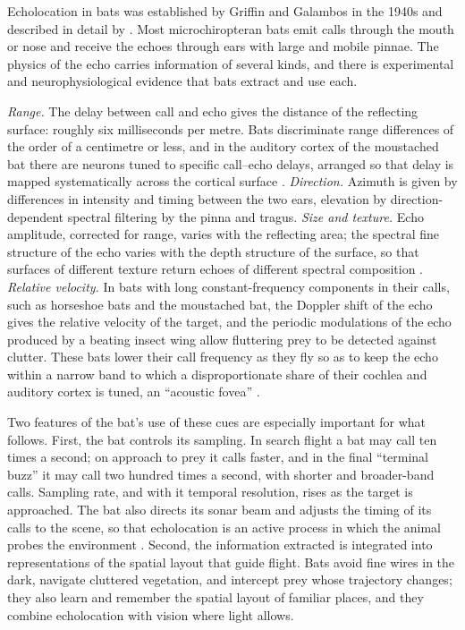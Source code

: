 \documentclass{situationist-preprint}
\begin{document}
Echolocation in bats was established by Griffin and Galambos in the 1940s and described in detail by \citet{Griffin1958}. Most microchiropteran bats emit calls through the mouth or nose and receive the echoes through ears with large and mobile pinnae. The physics of the echo carries information of several kinds, and there is experimental and neurophysiological evidence that bats extract and use each.

\emph{Range.} The delay between call and echo gives the distance of the reflecting surface: roughly six milliseconds per metre. Bats discriminate range differences of the order of a centimetre or less, and in the auditory cortex of the moustached bat there are neurons tuned to specific call--echo delays, arranged so that delay is mapped systematically across the cortical surface \citep{Suga1990}. \emph{Direction.} Azimuth is given by differences in intensity and timing between the two ears, elevation by direction-dependent spectral filtering by the pinna and tragus. \emph{Size and texture.} Echo amplitude, corrected for range, varies with the reflecting area; the spectral fine structure of the echo varies with the depth structure of the surface, so that surfaces of different texture return echoes of different spectral composition \citep{Simmons1989}. \emph{Relative velocity.} In bats with long constant-frequency components in their calls, such as horseshoe bats and the moustached bat, the Doppler shift of the echo gives the relative velocity of the target, and the periodic modulations of the echo produced by a beating insect wing allow fluttering prey to be detected against clutter. These bats lower their call frequency as they fly so as to keep the echo within a narrow band to which a disproportionate share of their cochlea and auditory cortex is tuned, an \enquote{acoustic fovea} \citep{Suga1990}.

Two features of the bat's use of these cues are especially important for what follows. First, the bat controls its sampling. In search flight a bat may call ten times a second; on approach to prey it calls faster, and in the final \enquote{terminal buzz} it may call two hundred times a second, with shorter and broader-band calls. Sampling rate, and with it temporal resolution, rises as the target is approached. The bat also directs its sonar beam and adjusts the timing of its calls to the scene, so that echolocation is an active process in which the animal probes the environment \citep{UlanovskyMoss2008,MossSurlykke2010}. Second, the information extracted is integrated into representations of the spatial layout that guide flight. Bats avoid fine wires in the dark, navigate cluttered vegetation, and intercept prey whose trajectory changes; they also learn and remember the spatial layout of familiar places, and they combine echolocation with vision where light allows.
\end{document}
